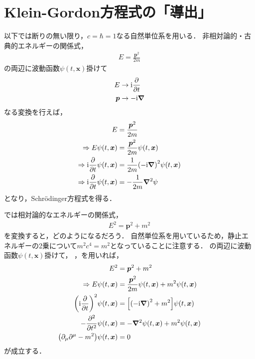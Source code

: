 \documentclass{report}
\begin{document}
  \section{Klein-Gordon方程式の「導出」}
    以下では断りの無い限り，$c = \hbar = 1$なる自然単位系を用いる．
    非相対論的・古典的エネルギーの関係式，
    \begin{align}
      E = \frac{\bm{p}^2}{2m}
    \end{align}
    の両辺に波動函数$\psi(t, \bm{x})$掛けて
    \begin{align}
      E &\to \mathrm{i}\pdv{t} \label{energy-to-diff}\\ 
      \bm{p} &\to -\mathrm{i}\grad \label{momentum-to-diff}
    \end{align}
    なる変換を行えば，
    \begin{align}
      E &= \frac{\bm{p}^2}{2m} \\ 
      \Rightarrow E\psi(t, \bm{x}) &= \frac{\bm{p}^2}{2m}\psi(t, \bm{x}) \\ 
      \Rightarrow \mathrm{i}\pdv{t}\psi(t, \bm{x}) &= \frac{1}{2m}\qty(-\mathrm{i}\grad)^2\psi(t, \bm{x}) \\ 
      \Rightarrow \mathrm{i}\pdv{t}\psi(t, \bm{x}) &= -\frac{1}{2m}\grad^2\psi
    \end{align}
    となり，Schr\"odinger方程式を得る．
    \par
    では相対論的なエネルギーの関係式，
    \begin{align}
      E^2 = \bm{p}^2 + m^2\label{relativity-energy}
    \end{align}
    を変換すると，どのようになるだろう．
    自然単位系を用いているため，静止エネルギーの2乗について$m^2c^4 = m^2$となっていることに注意する．
    の両辺に波動函数$\psi(t, \bm{x})$掛けて，
    ，を用いれば，
    \begin{align}
      E^2 &= \bm{p}^2 + m^2 \\ 
      \Rightarrow E\psi(t, \bm{x}) &= \frac{\bm{p}^2}{2m}\psi(t, \bm{x}) + m^2\psi(t, \bm{x}) \\ 
      \qty(\mathrm{i}\pdv{t})^2\psi(t, \bm{x}) &= \qty[\qty(-\mathrm{i}\grad)^2 + m^2]\psi(t, \bm{x}) \\ 
      -\pdv[2]{t}\psi(t, \bm{x}) &= -\grad^2\psi(t, \bm{x}) + m^2\psi(t, \bm{x}) \\ 
      \qty(\partial_{\mu}\partial^{\mu} - m^2)\psi(t, \bm{x}) &= 0
    \end{align}
    が成立する．
\end{document}
